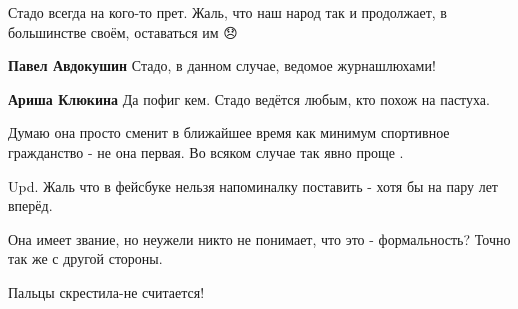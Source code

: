 \begin{itemize}
Стадо всегда на кого-то прет. Жаль, что наш народ так и продолжает, в
большинстве своём, оставаться им 😞

\begin{itemize}
 
\textbf{Павел Авдокушин} Стадо, в данном случае, ведомое журнашлюхами!

 
\textbf{Ариша Клюкина} Да пофиг кем. Стадо ведётся любым, кто похож на пастуха.
\end{itemize}

 

Думаю она просто сменит в ближайшее время как минимум спортивное гражданство -
не она первая. Во всяком случае так явно проще \Smiley[1.0][yellow].

Upd. Жаль что в фейсбуке нельзя напоминалку поставить - хотя бы на пару лет
вперёд.


 
Она имеет звание, но неужели никто не понимает, что это - формальность? Точно так же с другой стороны.

 
Пальцы скрестила-не считается!

 


\end{itemize}
